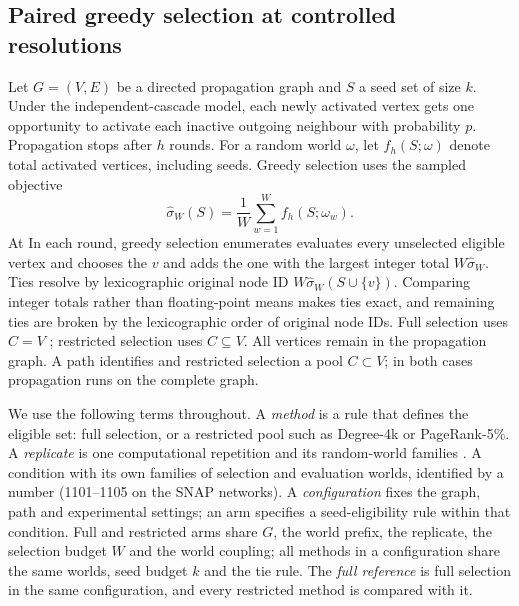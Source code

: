 \documentclass[smallextended]{svjour3}
\providecommand{\DIFaddtex}[1]{{\protect\color{blue} \sf #1}} %
\providecommand{\DIFdeltex}[1]{{\protect\color{red} \scriptsize #1}} %
\providecommand{\DIFaddbegin}{} %
\providecommand{\DIFaddend}{} %
\providecommand{\DIFdelbegin}{} %
\providecommand{\DIFdelend}{} %
\providecommand{\DIFadd}[1]{\texorpdfstring{\DIFaddtex{#1}}{#1}} %
\providecommand{\DIFdel}[1]{\texorpdfstring{\DIFdeltex{#1}}{}} %
\providecommand{\DIFscaledelfig}{0.5}
\newlength{\DIFdelgraphicswidth} %
\newlength{\DIFdelgraphicsheight} %
\providecommand{\DIFaddincludegraphics}[2][]{{\color{blue}\fbox{\DIFOincludegraphics[#1]{#2}}}} %
\providecommand{\DIFdelincludegraphics}[2][]{%
\sbox{\DIFdelgraphicsbox}{\DIFOincludegraphics[#1]{#2}}%
\settoboxwidth{\DIFdelgraphicswidth}{\DIFdelgraphicsbox} %
\settoboxtotalheight{\DIFdelgraphicsheight}{\DIFdelgraphicsbox} %
\scalebox{\DIFscaledelfig}{%
\parbox[b]{\DIFdelgraphicswidth}{\usebox{\DIFdelgraphicsbox}\\[-\baselineskip] \rule{\DIFdelgraphicswidth}{0em}}\llap{\resizebox{\DIFdelgraphicswidth}{\DIFdelgraphicsheight}{%
\setlength{\unitlength}{\DIFdelgraphicswidth}%
\begin{picture}(1,1)%
\thicklines\linethickness{2pt} %
{\color[rgb]{1,0,0}\put(0,0){\framebox(1,1){}}}%
{\color[rgb]{1,0,0}\put(0,0){\line( 1,1){1}}}%
{\color[rgb]{1,0,0}\put(0,1){\line(1,-1){1}}}%
\end{picture}%
}\hspace*{3pt}}} %
} %
\DeclareRobustCommand{\DIFaddbegin}{\DIFOaddbegin \let\includegraphics\DIFaddincludegraphics} %
\DeclareRobustCommand{\DIFaddend}{\DIFOaddend \let\includegraphics\DIFOincludegraphics} %
\DeclareRobustCommand{\DIFdelbegin}{\DIFOdelbegin \let\includegraphics\DIFdelincludegraphics} %
\DeclareRobustCommand{\DIFdelend}{\DIFOaddend \let\includegraphics\DIFOincludegraphics} %
\begin{document}
\subsection{Paired \DIFaddbegin \DIFadd{greedy }\DIFaddend selection\DIFdelbegin \DIFdel{at controlled resolutions}\DIFdelend }\DIFaddbegin \label{sec:paired}
\DIFaddend Let $G=(V,E)$ be a directed propagation graph and $S$ a seed set of size $k$. Under the independent-cascade model, each newly activated vertex gets one opportunity to activate each inactive outgoing neighbour with probability $p$. Propagation stops after $h$ rounds. For a random world $\omega$, let $f_h(S;\omega)$ denote total activated vertices, including seeds. Greedy selection uses the sampled objective
\begin{equation}
\widehat\sigma_W(S)=\frac{1}{W}\sum_{w=1}^{W}f_h(S;\omega_w).
\end{equation}
\DIFdelbegin \DIFdel{At }\DIFdelend \DIFaddbegin \DIFadd{In }\DIFaddend each round, greedy selection \DIFdelbegin \DIFdel{enumerates }\DIFdelend \DIFaddbegin \DIFadd{evaluates }\DIFaddend every unselected eligible vertex \DIFdelbegin \DIFdel{and chooses the }\DIFdelend \DIFaddbegin \DIFadd{$v$ and adds the one with the }\DIFaddend largest integer total \DIFdelbegin \DIFdel{$W\widehat\sigma_W$. Ties resolve by lexicographic original node ID}\DIFdelend \DIFaddbegin \DIFadd{$W\widehat\sigma_W(S\cup\{v\})$. Comparing integer totals rather than floating-point means makes ties exact, and remaining ties are broken by the lexicographic order of original node IDs}\DIFaddend . Full selection uses $C=V$ \DIFdelbegin \DIFdel{; restricted selection uses $C\subseteq V$. All vertices remain in the propagation graph. A path identifies }\DIFdelend \DIFaddbegin \DIFadd{and restricted selection a pool $C\subset V$; in both cases propagation runs on the complete graph.
}

\DIFadd{We use the following terms throughout. A \emph{method} is a rule that defines the eligible set: full selection, or a restricted pool such as Degree-4k or PageRank-5\%. A \emph{replicate} is }\DIFaddend one computational repetition \DIFdelbegin \DIFdel{and its random-world families . A condition }\DIFdelend \DIFaddbegin \DIFadd{with its own families of selection and evaluation worlds, identified by a number (1101--1105 on the SNAP networks). A \emph{configuration} }\DIFaddend fixes the graph, \DIFdelbegin \DIFdel{path and experimental settings; an arm specifies a seed-eligibility rule within that condition. Full and restricted arms share $G$, the world prefix, }\DIFdelend \DIFaddbegin \DIFadd{the replicate, the selection budget $W$ and the world coupling; all methods in a configuration share the same worlds, seed budget }\DIFaddend $k$ and \DIFdelbegin \DIFdel{the }\DIFdelend tie rule. \DIFaddbegin \DIFadd{The \emph{full reference} is full selection in the same configuration, and every restricted method is compared with it.
}\DIFaddend 
\end{document}
